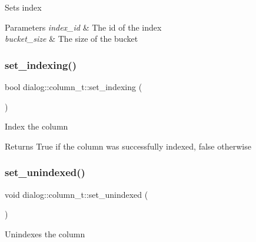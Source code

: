 Sets index 
\begin{DoxyParams}{Parameters}
{\em index\+\_\+id} & The id of the index \\
\hline
{\em bucket\+\_\+size} & The size of the bucket \\
\hline
\end{DoxyParams}
\mbox{\label{classdialog_1_1column__t_ab9651b430ffa98ff36af3c643c591576}} 
\subsubsection{\texorpdfstring{set\+\_\+indexing()}{set\_indexing()}}
{\footnotesize\ttfamily bool dialog\+::column\+\_\+t\+::set\+\_\+indexing (\begin{DoxyParamCaption}{ }\end{DoxyParamCaption})\hspace{0.3cm}{\ttfamily [inline]}}

Index the column \begin{DoxyReturn}{Returns}
True if the column was successfully indexed, false otherwise 
\end{DoxyReturn}
\mbox{\label{classdialog_1_1column__t_abd10df62173d46d9189306cca8569494}} 
\subsubsection{\texorpdfstring{set\+\_\+unindexed()}{set\_unindexed()}}
{\footnotesize\ttfamily void dialog\+::column\+\_\+t\+::set\+\_\+unindexed (\begin{DoxyParamCaption}{ }\end{DoxyParamCaption})\hspace{0.3cm}{\ttfamily [inline]}}

Unindexes the column \mbox{\label{classdialog_1_1column__t_a8316411224f15b6f25c59471422ca167}} 
